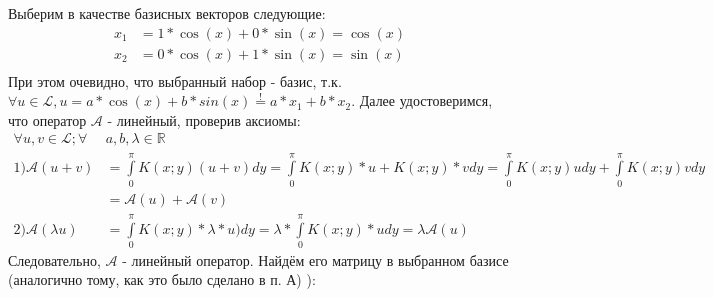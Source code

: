 \documentclass[12pt, a4paper]{article}
\begin{document}
Выберим в качестве базисных векторов следующие:
\begin{equation*}
\begin{aligned}
x_1 &= 1 * \cos(x) + 0 * \sin(x) = \cos(x)\\
x_2 &= 0 * \cos(x) + 1 * \sin(x) = \sin(x)\\
\end{aligned}
\end{equation*}
При этом очевидно, что выбранный набор - базис, т.к. $\forall u \in \mathcal{L}, u=a*\cos(x) + b*sin(x) \overset{!}{=} a*x_1 + b*x_2$. 
Далее удостоверимся, что оператор $\mathcal{A}$ - линейный, проверив аксиомы:
\begin{equation*}
\begin{aligned}
\forall u,v \in \mathcal{L}; \forall &a,b,\lambda \in \mathbb{R}\\
1)\mathcal{A}(u+v) &= \int\limits_{0}^{\pi} K(x;y) (u+v) dy = \int\limits_{0}^{\pi} K(x;y) * u + K(x;y)*v dy = \int\limits_{0}^{\pi} K(x;y)u dy + \int\limits_{0}^{\pi} K(x;y) v  dy\\
&= \mathcal{A}(u) + \mathcal{A}(v)\\
2)\mathcal{A}(\lambda u) &= \int\limits_{0}^{\pi} K(x;y) * \lambda * u) dy = \lambda * \int\limits_{0}^{\pi} K(x;y) * u dy = \lambda \mathcal{A}(u)
\end{aligned}
\end{equation*}
Следовательно, $\mathcal{A}$ - линейный оператор. Найдём его матрицу в выбранном базисе (аналогично тому, как это было сделано в п. А) ):
\end{document}
